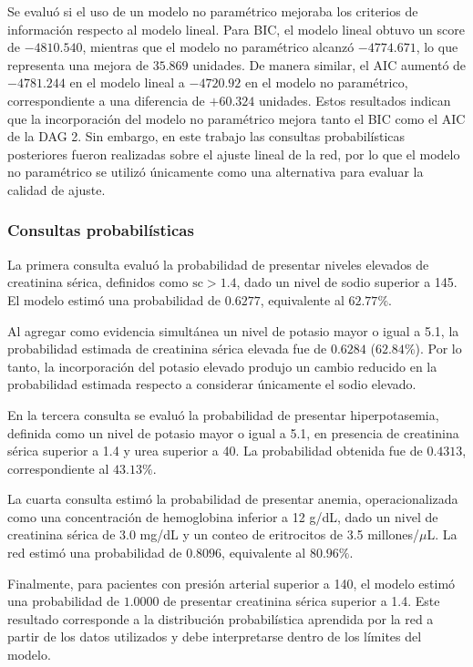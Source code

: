\documentclass{Academic}
\begin{document}
Se evaluó si el uso de un modelo no paramétrico mejoraba los criterios de
información respecto al modelo lineal. Para BIC, el modelo lineal obtuvo un
score de $-4810.540$, mientras que el modelo no paramétrico alcanzó
$-4774.671$, lo que representa una mejora de $35.869$ unidades. De manera
similar, el AIC aumentó de $-4781.244$ en el modelo lineal a $-4720.92$ en
el modelo no paramétrico, correspondiente a una diferencia de $+60.324$
unidades. Estos resultados indican que la incorporación del
modelo no paramétrico mejora tanto el BIC como el AIC de la DAG 2. Sin embargo,
en este trabajo las consultas probabilísticas posteriores fueron realizadas
sobre el ajuste lineal de la red, por lo que el modelo no paramétrico se
utilizó únicamente como una alternativa para evaluar la calidad de ajuste.

\subsubsection{Consultas probabilísticas}
La primera consulta evaluó la probabilidad de presentar niveles elevados de
creatinina sérica, definidos como $\mathrm{sc}>1.4$, dado un nivel de sodio
superior a 145. El modelo estimó una probabilidad de $0.6277$, equivalente
al $62.77\%$.

Al agregar como evidencia simultánea un nivel de potasio mayor o igual a
5.1, la probabilidad estimada de creatinina sérica elevada fue de $0.6284$
($62.84\%$). Por lo tanto, la incorporación del potasio elevado produjo un
cambio reducido en la probabilidad estimada respecto a considerar únicamente
el sodio elevado.

En la tercera consulta se evaluó la probabilidad de presentar hiperpotasemia,
definida como un nivel de potasio mayor o igual a 5.1, en presencia de
creatinina sérica superior a 1.4 y urea superior a 40. La probabilidad
obtenida fue de $0.4313$, correspondiente al $43.13\%$.

La cuarta consulta estimó la probabilidad de presentar anemia, operacionalizada
como una concentración de hemoglobina inferior a 12 g/dL, dado un nivel de
creatinina sérica de 3.0 mg/dL y un conteo de eritrocitos de
3.5 millones/$\mu$L. La red estimó una probabilidad de $0.8096$, equivalente
al $80.96\%$.

Finalmente, para pacientes con presión arterial superior a 140, el modelo
estimó una probabilidad de $1.0000$ de presentar creatinina sérica superior
a 1.4. Este resultado corresponde a la distribución probabilística aprendida
por la red a partir de los datos utilizados y debe interpretarse dentro de
los límites del modelo.
\end{document}
